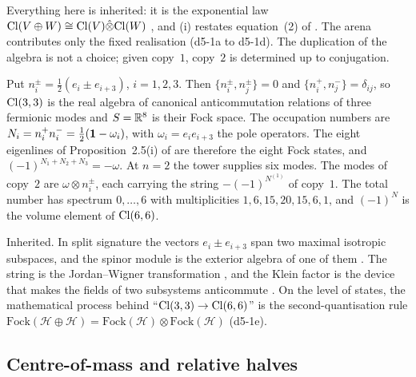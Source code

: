 Everything here is inherited: it is the exponential law $\mathrm{Cl}(V\oplus W)\cong\mathrm{Cl}(V)\hat\otimes\mathrm{Cl}(W)$ \cite{Chevalley54,LawsonMichelsohn89}, and
(i) restates equation~(2) of \cite{ES17}. The arena contributes only the fixed realisation (d5-1a to d5-1d). The duplication of the
algebra is not a choice; given copy~$1$, copy~$2$ is determined up to conjugation.

\begin{proposition}
\label{d5:prop:fock}
Put $n^\pm_i=\tfrac12(e_i\pm e_{i+3})$, $i=1,2,3$. Then $\{n^\pm_i,n^\pm_j\}=0$ and $\{n^+_i,n^-_j\}=\delta_{ij}$, so $\mathrm{Cl}(3,3)$ is the real
algebra of canonical anticommutation relations of three fermionic modes and $S=\mathbb{R}^8$ is their Fock space. The occupation numbers are
$N_i=n^+_in^-_i=\tfrac12(\mathbf 1-\omega_i)$, with $\omega_i=e_ie_{i+3}$ the pole operators. The eight eigenlines of Proposition~2.5(i) of
\cite{ES17} are therefore the eight Fock states, and $(-1)^{N_1+N_2+N_3}=-\omega$. At $n=2$ the tower supplies six modes. The modes of copy~$2$ are
$\omega\otimes n^\pm_i$, each carrying the string $-(-1)^{N^{(1)}}$ of copy~$1$. The total number has spectrum $0,\dots,6$ with multiplicities
$1,6,15,20,15,6,1$, and $(-1)^N$ is the volume element of $\mathrm{Cl}(6,6)$.
\end{proposition}

Inherited. In split signature the vectors $e_i\pm e_{i+3}$ span two maximal isotropic subspaces, and the spinor module is the exterior
algebra of one of them \cite{Chevalley54}. The string is the Jordan--Wigner transformation \cite{JordanWigner28}, and the Klein factor is the
device that makes the fields of two subsystems anticommute \cite{Klein38}. On the level of states, the mathematical process behind
``$\mathrm{Cl}(3,3)\to\mathrm{Cl}(6,6)$'' is the second-quantisation rule $\mathrm{Fock}(\mathcal H\oplus\mathcal H)=\mathrm{Fock}(\mathcal H)\otimes\mathrm{Fock}(\mathcal H)$
(d5-1e).

\subsection{Centre-of-mass and relative halves}
\label{d5:sec:cm}

